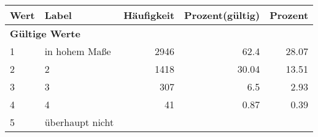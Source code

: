      \begin{longtable}{lXrrr}
     \toprule
     \textbf{Wert} & \textbf{Label} & \textbf{Häufigkeit} & \textbf{Prozent(gültig)} & \textbf{Prozent} \\
     \endhead
     \midrule
     \multicolumn{5}{l}{\textbf{Gültige Werte}}\\

     1 &
     \multicolumn{1}{X}{ in hohem Maße   } &


       \num{2946} &
       \num[round-mode=places,round-precision=2]{62,4} &
         \num[round-mode=places,round-precision=2]{28,07} \\

     2 &
     \multicolumn{1}{X}{ 2   } &


       \num{1418} &
       \num[round-mode=places,round-precision=2]{30,04} &
         \num[round-mode=places,round-precision=2]{13,51} \\

     3 &
     \multicolumn{1}{X}{ 3   } &


       \num{307} &
       \num[round-mode=places,round-precision=2]{6,5} &
         \num[round-mode=places,round-precision=2]{2,93} \\

     4 &
     \multicolumn{1}{X}{ 4   } &


       \num{41} &
       \num[round-mode=places,round-precision=2]{0,87} &
         \num[round-mode=places,round-precision=2]{0,39} \\

     5 &
     \multicolumn{1}{X}{ überhaupt nicht   } &



\end{longtable}
